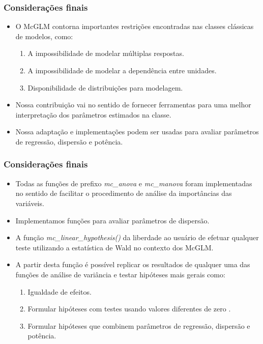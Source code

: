 \documentclass[10pt,
  aspectratio=169,
  serif,
  mathserif,
  professionalfont,
  compress,
  handout,
  ]{beamer}\usepackage[]{graphicx}\usepackage[]{color}
\begin{document}
\begin{frame}
  \frametitle{Considerações finais}
  
\begin{itemize}
\itemsep 2ex
  \item O McGLM contorna importantes restrições encontradas nas classes clássicas de modelos, como: 

  \begin{enumerate}
    \item A impossibilidade de modelar múltiplas respostas.
    \item A impossibilidade de modelar a dependência entre unidades. 
    \item Disponibilidade de distribuições para modelagem.
  \end{enumerate}

    \item Nossa contribuição vai no sentido de fornecer ferramentas para uma melhor interpretação dos parâmetros estimados na classe.
    
    \item Nossa adaptação e implementações podem ser usadas para avaliar parâmetros de regressão, dispersão e potência.

\end{itemize}

\end{frame}


\begin{frame}
  \frametitle{Considerações finais}
  
\begin{itemize}
\itemsep 2ex
  \item Todas as funções de prefixo \emph{mc\_anova} e \emph{mc\_manova} foram implementadas no sentido de facilitar o procedimento de análise da importâncias das variáveis.
  
  \item Implementamos funções para avaliar parâmetros de dispersão.
  
  \item A função \emph{mc\_linear\_hypothesis()} da liberdade ao usuário de efetuar qualquer teste utilizando a estatística de Wald no contexto dos McGLM. 

 \item A partir desta função é possível replicar os resultados de qualquer uma das funções de análise de variância e testar hipóteses mais gerais como:

  \begin{enumerate}
    \item Igualdade de efeitos.
    \item Formular hipóteses com testes usando valores diferentes de zero .
    \item Formular hipóteses que combinem parâmetros de regressão, dispersão e potência.
  \end{enumerate}

\end{itemize}

\end{frame}
\end{document}
